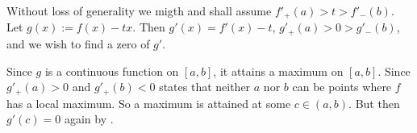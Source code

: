 \documentclass[12pt]{article}
\begin{document}
Without loss of generality we migth and shall assume $f'_{+}(a)>t>f'_{-}(b)$. Let $g(x):=f(x)-tx$.  
Then $g'(x)=f'(x)-t$, $g'_{+}(a)>0>g'_{-}(b)$, and we wish to find a zero of $g'$.

Since $g$ is a continuous function on $[a,b]$, it attains a maximum on $[a,b]$.  
Since $g'_+(a)>0$ and $g'_+(b)<0$  states that 
neither $a$ nor $b$ can be points where $f$ has a local maximum. 
So a maximum is attained at some $c \in (a,b)$.  But then $g'(c)=0$ again by .
\end{document}
